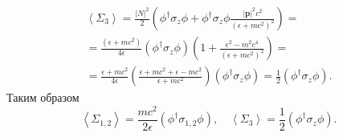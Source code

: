 \documentclass[a4paper]{article}
\begin{document}
\begin{sol}
\begin{multline*}
	\left<\Sigma_3 \right> = \frac{|N|^2}{2} \left( 
		\phi^\dagger \sigma_z \phi+ \phi^\dagger
	\sigma_z \phi \frac{|\mathbf{p}|^2 c^2}{(\epsilon +mc^2)^2}\right) =\\=
	\frac{(\epsilon +mc^2)}{4\epsilon }
	(\phi^\dagger \sigma_z \phi) \left( 
	1+ \frac{\epsilon ^2 -m^2 c^4}{(\epsilon +mc^2)^2}\right) =\\=
	\frac{\epsilon +mc^2}{4\epsilon } \left( 
	\frac{\epsilon +mc^2 +\epsilon  -mc^2}{\epsilon +mc^2}\right) (\phi^\dagger \sigma_z \phi)=
	\frac{1}{2} (\phi^\dagger \sigma_z \phi)
.\end{multline*} 
Таким образом
\[
\left<\Sigma_{1,2} \right> = \frac{mc^2}{2\epsilon }
(\phi^\dagger \sigma_{1,2} \phi),\quad
\left<\Sigma_3 \right> =\frac{1}{2} (\phi^\dagger \sigma_z \phi)
.\] 
\end{sol}
\begin{hiProb}[7]
\end{hiProb}
\end{document}
